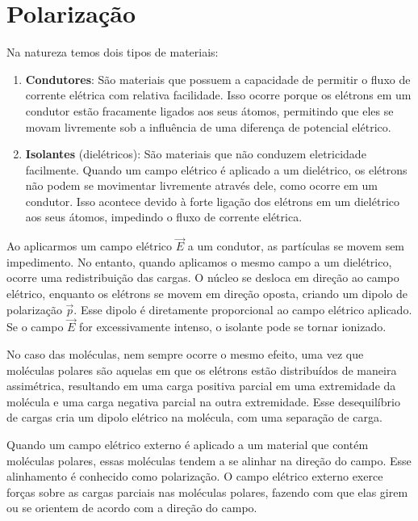 \newpage\section{Polarização}
Na natureza temos dois tipos de materiais:
\begin{enumerate}
    \item \textbf{Condutores}:  São materiais que possuem a capacidade de permitir o fluxo de corrente elétrica com relativa facilidade. Isso ocorre porque os elétrons em um condutor estão fracamente ligados aos seus átomos, permitindo que eles se movam livremente sob a influência de uma diferença de potencial elétrico.
    \item \textbf{Isolantes} (dielétricos): São materiais que não conduzem eletricidade facilmente. Quando um campo elétrico é aplicado a um dielétrico, os elétrons não podem se movimentar livremente através dele, como ocorre em um condutor. Isso acontece devido à forte ligação dos elétrons em um dielétrico aos seus átomos, impedindo o fluxo de corrente elétrica.
\end{enumerate}

Ao aplicarmos um campo elétrico $\vec{E}$ a um condutor, as partículas se movem sem impedimento. No entanto, quando aplicamos o mesmo campo a um dielétrico, ocorre uma redistribuição das cargas. O núcleo se desloca em direção ao campo elétrico, enquanto os elétrons se movem em direção oposta, criando um dipolo de polarização $\vec{p}$. Esse dipolo é diretamente proporcional ao campo elétrico aplicado. Se o campo $\vec{E}$ for excessivamente intenso, o isolante pode se tornar ionizado.

No caso das moléculas, nem sempre ocorre o mesmo efeito, uma vez que moléculas polares são aquelas em que os elétrons estão distribuídos de maneira assimétrica, resultando em uma carga positiva parcial em uma extremidade da molécula e uma carga negativa parcial na outra extremidade. Esse desequilíbrio de cargas cria um dipolo elétrico na molécula, com uma separação de carga.

Quando um campo elétrico externo é aplicado a um material que contém moléculas polares, essas moléculas tendem a se alinhar na direção do campo. Esse alinhamento é conhecido como polarização. O campo elétrico externo exerce forças sobre as cargas parciais nas moléculas polares, fazendo com que elas girem ou se orientem de acordo com a direção do campo.

